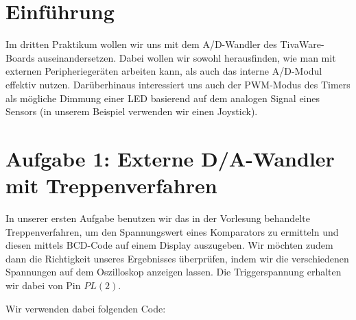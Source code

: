 \documentclass{article}
\begin{document}
\newpage


\tableofcontents

\listoffigures

\lstlistoflistings

\newpage

\section{Einführung}

Im dritten Praktikum wollen wir uns mit dem A/D-Wandler des TivaWare-Boards auseinandersetzen. Dabei wollen wir sowohl herausfinden, wie man mit externen Peripheriegeräten arbeiten kann, als auch das interne A/D-Modul effektiv nutzen. Darüberhinaus interessiert uns auch der PWM-Modus des Timers als mögliche Dimmung einer LED basierend auf dem analogen Signal eines Sensors (in unserem Beispiel verwenden wir einen Joystick).

\section{Aufgabe 1: Externe D/A-Wandler mit Treppenverfahren}

In unserer ersten Aufgabe benutzen wir das in der Vorlesung behandelte Treppenverfahren, um den Spannungswert eines Komparators zu ermitteln und diesen mittels BCD-Code auf einem Display auszugeben. Wir möchten zudem dann die Richtigkeit unseres Ergebnisses überprüfen, indem wir die verschiedenen Spannungen auf dem Oszilloskop anzeigen lassen. Die Triggerspannung erhalten wir dabei von Pin $PL(2)$.

Wir verwenden dabei folgenden Code:
\end{document}
